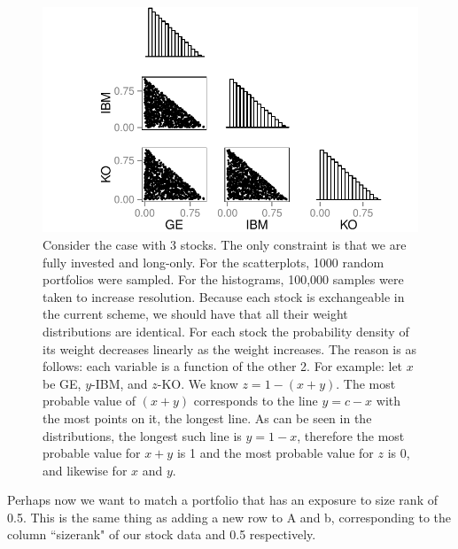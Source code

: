 \documentclass{article}\usepackage{graphicx, color}
\makeatletter
\def\maxwidth{ %
  \ifdim\Gin@nat@width>\linewidth
    \linewidth
  \else
    \Gin@nat@width
  \fi
}
\newenvironment{knitrout}{}{} %
\makeatother
\begin{document}
\begin{figure}[t]
\begin{knitrout}
\color{fgcolor}
\includegraphics[width=\maxwidth]{figure/figChunk1} 

\end{knitrout}

\caption{Consider the case with 3 stocks. The only constraint is that we are fully invested and long-only. For the scatterplots, 1000 random portfolios were sampled. For the histograms, 100,000 samples were taken to increase resolution. Because each stock is exchangeable in the current scheme, we should have that all their weight distributions are identical. For each stock the probability density of its weight decreases linearly as the weight increases. The reason is as follows: each variable is a function of the other 2. For example: let $x$ be GE, $y$-IBM, and $z$-KO. We know $z = 1 - (x+y)$. The most probable value of $(x+y)$ corresponds to the line $y= c-x$ with the most points on it, the longest line. As can be seen in the distributions, the longest such line is $y=1-x$, therefore the most probable value for $x+y$ is 1 and the most probable value for $z$ is 0, and likewise for $x$ and $y$.}
\end{figure}

Perhaps now we want to match a portfolio that has an exposure to size rank of 0.5. This is the same thing as adding a new row to A and b, corresponding to the column ``sizerank" of our stock data and 0.5 respectively.
\end{document}
